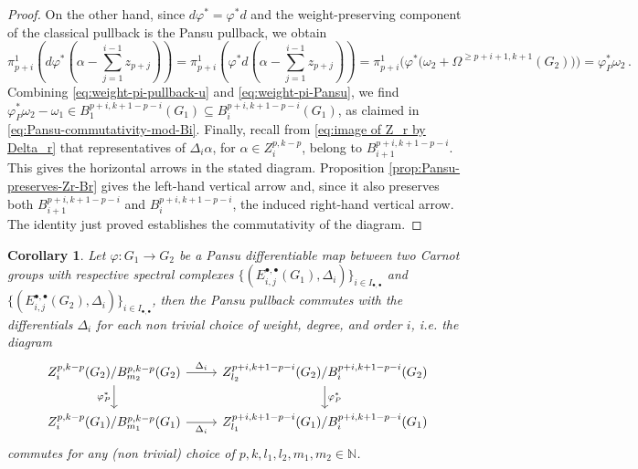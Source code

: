 \documentclass[dvipsnames]{amsart}
\newtheorem{corollary}[theorem]{Corollary}
\theoremstyle{definition}
\theoremstyle{definition}
\numberwithin{equation}{section}
\begin{document}
\begin{proof}
On the other hand, since $d\varphi^\ast=\varphi^\ast d$
and the weight-preserving component of the classical pullback is the
Pansu pullback, we obtain
\begin{equation}
\label{eq:weight-pi-Pansu}
\pi_{p+i}^1\left(d\varphi^*\left(\alpha-\sum_{j=1}^{i-1}z_{p+j}\right)\right)
=\pi_{p+i}^1\left(\varphi^\ast d\left(\alpha-\sum_{j=1}^{i-1}z_{p+j}\right)\right)=\pi_{p+i}^1\big(\varphi^\ast\big(\omega_2+\Omega^{\ge p+i+1,k+1}(G_2)\big)\big)=
\varphi_P^*\omega_2\,.
\end{equation}
Combining
\eqref{eq:weight-pi-pullback-u} and
\eqref{eq:weight-pi-Pansu}, we find $\varphi_P^*\omega_2-\omega_1
\in
B_1^{p+i,k+1-p-i}(G_1)
\subseteq
B_i^{p+i,k+1-p-i}(G_1)$, as claimed in
\eqref{eq:Pansu-commutativity-mod-Bi}.
Finally, recall from \eqref{eq:image of Z_r by Delta_r} that representatives of $\Delta_i\alpha$, for $\alpha\in Z_i^{p,k-p}$, belong to $B_{i+1}^{p+i,k+1-p-i}$. This gives the horizontal arrows in the stated diagram. Proposition \ref{prop:Pansu-preserves-Zr-Br} gives the left-hand vertical arrow and, since it also preserves both $B_{i+1}^{p+i,k+1-p-i}$ and $B_i^{p+i,k+1-p-i}$, the induced right-hand vertical arrow. The identity just proved establishes the commutativity of the diagram. 
\end{proof}


\begin{corollary}
\label{cor: commutativity spectral}
    Let $\varphi\colon G_1\to G_2$ be a Pansu differentiable map between two Carnot groups with respective spectral complexes $\{(E_{i,j}^{\bullet,\bullet}(G_1),\Delta_i)\}_{i\in I_{\bullet,\bullet}}$ and $\{(E_{i,j}^{\bullet,\bullet}(G_2),\Delta_{i})\}_{i\in I_{\bullet,\bullet}}$, then the Pansu pullback commutes with the differentials $\Delta_i$ for each non trivial choice of weight, degree, and order $i$, i.e. the diagram
\begin{equation}\label{diagram commutativity}
\begin{tikzcd}
Z_i^{p,k-p}(G_2) /B_{m_2}^{p,k-p}(G_2)\arrow[r, "\Delta_i"] \arrow[d, "\varphi_P^\ast"'] 
  & Z_{l_2}^{p+i,k+1-p-i}(G_2)/B_i^{p+i,k+1-p-i}(G_2) \arrow[d, "\varphi_P^\ast"] \\
Z_i^{p,k-p}(G_1)/B_{m_1}^{p,k-p}(G_1) \arrow[r, "\Delta_i"'] 
  & Z_{l_1}^{p+i,k+1-p-i}(G_1)/B_i^{p+i,k+1-p-i}(G_1)
\end{tikzcd}
\end{equation}
commutes for any (non trivial) choice of $p,k,l_1,l_2,m_1,m_2\in\mathbb{N}$.
\end{corollary}
\end{document}

